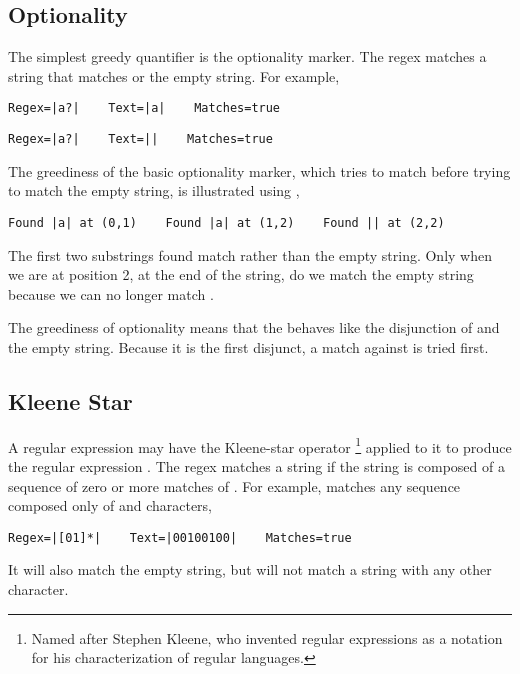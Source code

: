 \subsection{Optionality}

The simplest greedy quantifier is the optionality marker.  The regex
 matches a string that matches  or the
empty string.  For example,
%
\begin{verbatim}
Regex=|a?|    Text=|a|    Matches=true
\end{verbatim}
%
\begin{verbatim}
Regex=|a?|    Text=||    Matches=true
\end{verbatim}

The greediness of the basic optionality marker, which tries to match
before trying to match the empty string, is illustrated using
,
%
\begin{verbatim}
Found |a| at (0,1)    Found |a| at (1,2)    Found || at (2,2)
\end{verbatim}
%
The first two substrings found match  rather than
the empty string.  Only when we are at position 2, at the
end of the string, do we match the empty string because we
can no longer match .

The greediness of optionality means that the 
behaves like the disjunction  of  and
the empty string.  Because it is the first disjunct, a match
against  is tried first.


\subsection{Kleene Star}

A regular expression  may have the Kleene-star operator%
%
\footnote{Named after Stephen Kleene, who invented regular expressions
as a notation for his characterization of regular languages.}
%
applied to it to produce the regular expression \code{*}.
The regex \code{*} matches a string if the string is
composed of a sequence of zero or more matches of .  For
example, \code{[01]*} matches any sequence composed only of 
and  characters,
%
\begin{verbatim}
Regex=|[01]*|    Text=|00100100|    Matches=true
\end{verbatim}
%
It will also match the empty string, but will not match a string with
any other character.

